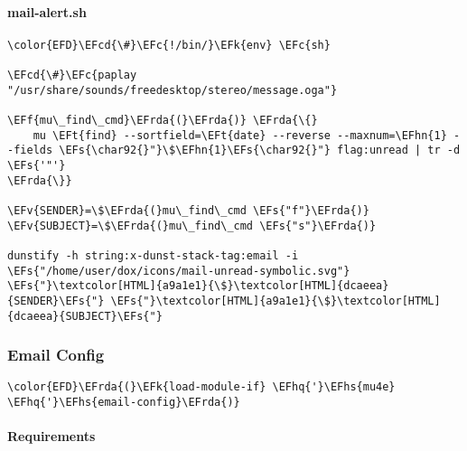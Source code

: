 \documentclass[a4wide,10pt]{article}
\newcommand{\EFc}[1]{\textcolor{EFc}{#1}} %
\newcommand{\EFcd}[1]{\textcolor{EFcd}{#1}} %
\newcommand{\EFs}[1]{\textcolor{EFs}{#1}} %
\newcommand{\EFk}[1]{\textcolor{EFk}{#1}} %
\newcommand{\EFf}[1]{\textcolor{EFf}{#1}} %
\newcommand{\EFv}[1]{\textcolor{EFv}{#1}} %
\newcommand{\EFt}[1]{\textcolor{EFt}{#1}} %
\newcommand{\EFhn}[1]{\textcolor{EFhn}{\textbf{#1}}} %
\newcommand{\EFhq}[1]{\textcolor{EFhq}{#1}} %
\newcommand{\EFhs}[1]{\textcolor{EFhs}{#1}} %
\newcommand{\EFrda}[1]{\textcolor{EFrda}{#1}} %
\begin{document}
\paragraph{mail-alert.sh}
\label{sec:org9b429a8}
\begin{Code}
\begin{Verbatim}
\color{EFD}\EFcd{\#}\EFc{!/bin/}\EFk{env} \EFc{sh}

\EFcd{\#}\EFc{paplay "/usr/share/sounds/freedesktop/stereo/message.oga"}

\EFf{mu\_find\_cmd}\EFrda{(}\EFrda{)} \EFrda{\{}
    mu \EFt{find} --sortfield=\EFt{date} --reverse --maxnum=\EFhn{1} --fields \EFs{\char92{}"}\$\EFhn{1}\EFs{\char92{}"} flag:unread | tr -d \EFs{'"'}
\EFrda{\}}

\EFv{SENDER}=\$\EFrda{(}mu\_find\_cmd \EFs{"f"}\EFrda{)}
\EFv{SUBJECT}=\$\EFrda{(}mu\_find\_cmd \EFs{"s"}\EFrda{)}

dunstify -h string:x-dunst-stack-tag:email -i \EFs{"/home/user/dox/icons/mail-unread-symbolic.svg"} \EFs{"}\textcolor[HTML]{a9a1e1}{\$}\textcolor[HTML]{dcaeea}{SENDER}\EFs{"} \EFs{"}\textcolor[HTML]{a9a1e1}{\$}\textcolor[HTML]{dcaeea}{SUBJECT}\EFs{"}
\end{Verbatim}
\end{Code}
\subsubsection{Email Config}
\label{sec:org4bbbec9}
\begin{Code}
\begin{Verbatim}
\color{EFD}\EFrda{(}\EFk{load-module-if} \EFhq{'}\EFhs{mu4e} \EFhq{'}\EFhs{email-config}\EFrda{)}
\end{Verbatim}
\end{Code}
\paragraph{Requirements}
\label{sec:org0f4a059}
\end{document}
